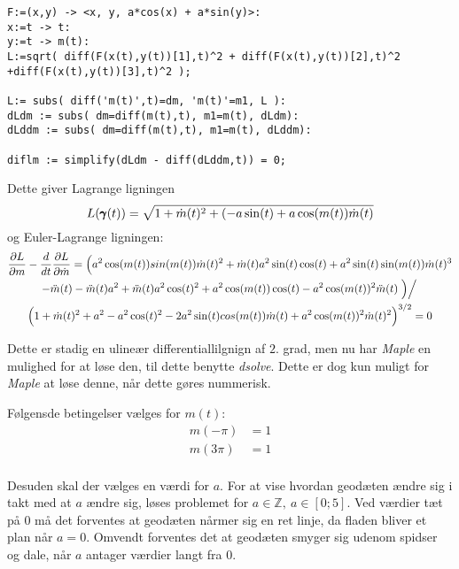 \begin{lstlisting}[caption=Udregning af de to Lagrange ligninger til (\ref{eq:aeggegeonem}) med \emph{Maple}  ]
F:=(x,y) -> <x, y, a*cos(x) + a*sin(y)>:
x:=t -> t:
y:=t -> m(t):
L:=sqrt( diff(F(x(t),y(t))[1],t)^2 + diff(F(x(t),y(t))[2],t)^2 +diff(F(x(t),y(t))[3],t)^2 );

L:= subs( diff('m(t)',t)=dm, 'm(t)'=m1, L ):
dLdm := subs( dm=diff(m(t),t), m1=m(t), dLdm):
dLddm := subs( dm=diff(m(t),t), m1=m(t), dLddm):

diflm := simplify(dLdm - diff(dLddm,t)) = 0;
\end{lstlisting}

Dette giver Lagrange ligningen
\begin{equation*}
L(\pmb{\gamma}(t)) = \sqrt{ 1 + \dot{m}(t)^2 + ( -a\sin(t) + a\cos(m(t))\dot{m}(t)}
\end{equation*}
og Euler-Lagrange ligningen:
\begin{multline*}
\frac{\partial L}{\partial m} - \frac{d}{d t} \frac{\partial L}{\partial \dot{m}} = 
\Big( a^2\cos(m(t))sin(m(t))\dot{m}(t)^2 + \dot{m}(t)a^2\sin(t)\cos(t)
+ a^2\sin(t)\sin(m(t))\dot{m}(t)^3\\
- \ddot{m}(t) - \ddot{m}(t)a^2
+ \ddot{m}(t) a^2 \cos(t)^2 + a^2\cos(m(t))\cos(t) - a^2\cos(m(t))^2\ddot{m}(t)
\left.\Big)\middle/\right.\\
\Big(
1 + \dot{m}(t)^2 + a^2 - a^2\cos(t)^2 - 2 a^2\sin(t)cos(m(t))\dot{m}(t)
+a^2\cos(m(t))^2\dot{m}(t)^2
\Big)^{3/2} = 0
\end{multline*}

Dette er stadig en ulineær differentiallilgnign af \(2.\) grad, men nu har \emph{Maple} en mulighed for at løse den,
til dette benytte \emph{dsolve}. Dette er dog kun muligt for \emph{Maple} at løse denne, når dette gøres nummerisk.

Følgensde betingelser vælges for \(m(t)\):
\begin{align*}
m(-\pi) &= 1\\
m(3\pi) &= 1\\
\end{align*}

Desuden skal der vælges en værdi for \(a\).
For at vise hvordan geodæten ændre sig i takt med at \(a\) ændre sig,
løses problemet for \(a \in \mathbb{Z},~a\in[0;5]\).
Ved værdier tæt på \(0\) må det forventes at geodæten nårmer sig en ret linje,
da fladen bliver et plan når \(a=0\).
Omvendt forventes det at geodæten smyger sig udenom spidser og dale,
når \(a\) antager værdier langt fra \(0\).

